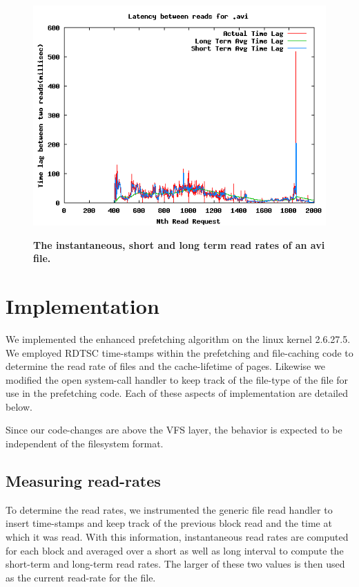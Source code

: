 \documentclass[twocolumn,10pt]{article}
\begin{document}
\begin{figure}[t!!]
\centering \resizebox{!}{3.7in}
{\includegraphics{avi-read-rate.png}}
\caption{\small \bf The instantaneous, short and long term read rates of an avi file.}
\label{fig:avi-read-rate}
\end{figure}

\section{Implementation}

We implemented the enhanced prefetching algorithm on the linux kernel 2.6.27.5.
We employed RDTSC time-stamps within the prefetching and file-caching code to
determine the read rate of files and the cache-lifetime of pages. Likewise we modified
the open system-call handler to keep track of the file-type of the file for use
in the prefetching code. Each of these aspects of implementation are detailed below.

Since our code-changes are above the VFS layer, the behavior is expected to be
independent of the filesystem format.

\subsection{Measuring read-rates}

To determine the read rates, we instrumented the generic file read handler to insert
time-stamps and keep track of the previous block read and the time at which it was read.
With this information, instantaneous read rates are computed for each block and averaged
over a short as well as long interval to compute the short-term and long-term read rates.
The larger of these two values is then used as the current read-rate for the file.
\end{document}
